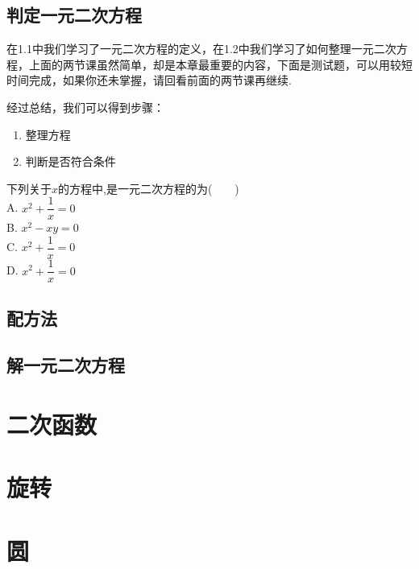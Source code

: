 \documentclass[lang=cn, 10pt, titlestyle=hang]{elegantbook}
\begin{document}
\section{判定一元二次方程}

在1.1中我们学习了一元二次方程的定义，在1.2中我们学习了如何整理一元二次方程，上面的两节课虽然简单，却是本章最重要的内容，下面是测试题，可以用较短时间完成，如果你还未掌握，请回看前面的两节课再继续.



经过总结，我们可以得到步骤：



\begin{enumerate}
    \item 整理方程
    \item 判断是否符合条件
\end{enumerate}


\begin{problemset}[1.1-1.3习题]
    \item 下列关于$x$的方程中,是一元二次方程的为($\ \ \ \ \ \ \ \ \ $) \\
    A. $x^2 + \dfrac{1}{x} = 0$\\
    B. $x^2 - xy = 0$\\
    C. $x^2 + \dfrac{1}{x} = 0$\\
    D. $x^2 + \dfrac{1}{x} = 0$\\
\end{problemset}

\section{配方法}



\section{解一元二次方程}

\chapter{二次函数}

\chapter{旋转}

\chapter{圆}
\end{document}
